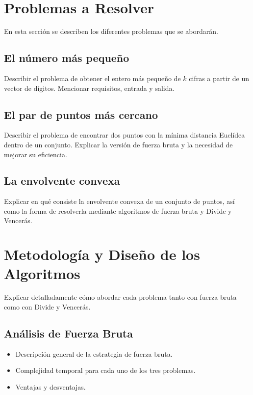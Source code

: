 \documentclass[a4paper,12pt]{article}
\begin{document}
\section{Problemas a Resolver}
En esta sección se describen los diferentes problemas que se abordarán.

\subsection{El número más pequeño}
Describir el problema de obtener el entero más pequeño de $k$ cifras 
a partir de un vector de dígitos. Mencionar requisitos, entrada y salida.

\subsection{El par de puntos más cercano}
Describir el problema de encontrar dos puntos con la mínima distancia 
Euclídea dentro de un conjunto. Explicar la versión de fuerza bruta 
y la necesidad de mejorar su eficiencia.

\subsection{La envolvente convexa}
Explicar en qué consiste la envolvente convexa de un conjunto de puntos, 
así como la forma de resolverla mediante algoritmos de fuerza bruta y 
Divide y Vencerás.

\section{Metodología y Diseño de los Algoritmos}
Explicar detalladamente cómo abordar cada problema tanto con fuerza bruta 
como con Divide y Vencerás.

\subsection{Análisis de Fuerza Bruta}
\begin{itemize}
    \item Descripción general de la estrategia de fuerza bruta.
    \item Complejidad temporal para cada uno de los tres problemas.
    \item Ventajas y desventajas.
\end{itemize}
\end{document}
